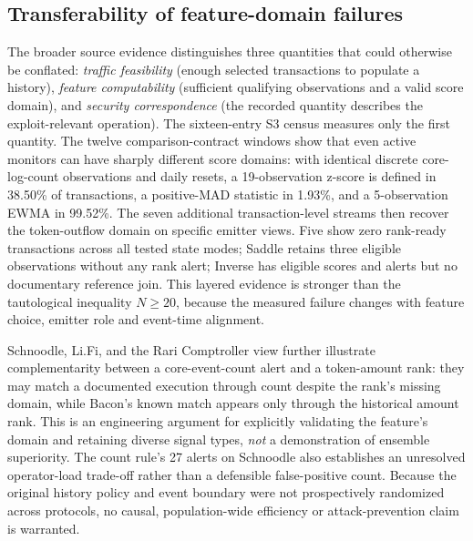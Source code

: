 \documentclass[preprint,12pt,authoryear]{elsarticle}
\begin{document}
\subsection{Transferability of feature-domain failures}\label{sec:transport}
The broader source evidence distinguishes three quantities that could otherwise be conflated: \emph{traffic feasibility} (enough selected transactions to populate a history), \emph{feature computability} (sufficient qualifying observations and a valid score domain), and \emph{security correspondence} (the recorded quantity describes the exploit-relevant operation). The sixteen-entry S3 census measures only the first quantity. The twelve comparison-contract windows show that even active monitors can have sharply different score domains: with identical discrete core-log-count observations and daily resets, a 19-observation z-score is defined in 38.50\% of transactions, a positive-MAD statistic in 1.93\%, and a 5-observation EWMA in 99.52\%. The seven additional transaction-level streams then recover the token-outflow domain on specific emitter views. Five show zero rank-ready transactions across all tested state modes; Saddle retains three eligible observations without any rank alert; Inverse has eligible scores and alerts but no documentary reference join. This layered evidence is stronger than the tautological inequality $N\geq20$, because the measured failure changes with feature choice, emitter role and event-time alignment.

Schnoodle, Li.Fi, and the Rari Comptroller view further illustrate complementarity between a core-event-count alert and a token-amount rank: they may match a documented execution through count despite the rank's missing domain, while Bacon's known match appears only through the historical amount rank. This is an engineering argument for explicitly validating the feature's domain and retaining diverse signal types, \emph{not} a demonstration of ensemble superiority. The count rule's 27 alerts on Schnoodle also establishes an unresolved operator-load trade-off rather than a defensible false-positive count. Because the original history policy and event boundary were not prospectively randomized across protocols, no causal, population-wide efficiency or attack-prevention claim is warranted.
\end{document}
